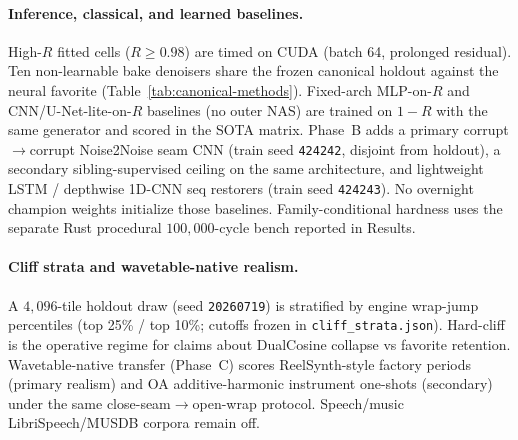 \paragraph{Inference, classical, and learned baselines.}
High-$R$ fitted cells ($R\ge 0.98$) are timed on CUDA (batch 64, prolonged residual).
Ten non-learnable bake denoisers share the frozen canonical holdout against the neural favorite (Table~\ref{tab:canonical-methods}).
Fixed-arch MLP-on-$R$ and CNN/U-Net-lite-on-$R$ baselines (no outer NAS) are trained on $1{-}R$ with the same generator and scored in the SOTA matrix.
Phase~B adds a primary corrupt$\to$corrupt Noise2Noise seam CNN (train seed \texttt{424242}, disjoint from holdout), a secondary sibling-supervised ceiling on the same architecture, and lightweight LSTM / depthwise 1D-CNN seq restorers (train seed \texttt{424243}).
No overnight champion weights initialize those baselines.
Family-conditional hardness uses the separate Rust procedural $100{,}000$-cycle bench reported in Results.

\paragraph{Cliff strata and wavetable-native realism.}
A $4{,}096$-tile holdout draw (seed \texttt{20260719}) is stratified by engine wrap-jump percentiles (top 25\% / top 10\%; cutoffs frozen in \texttt{cliff\_strata.json}).
Hard-cliff is the operative regime for claims about DualCosine collapse vs favorite retention.
Wavetable-native transfer (Phase~C) scores ReelSynth-style factory periods (primary realism) and OA additive-harmonic instrument one-shots (secondary) under the same close-seam$\to$open-wrap protocol.
Speech/music LibriSpeech/MUSDB corpora remain off.
